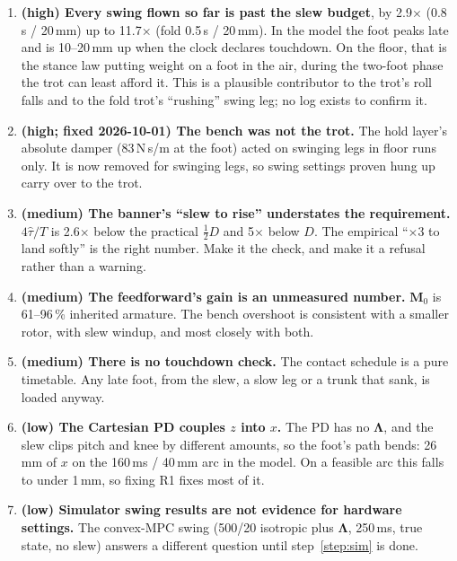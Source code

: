 \documentclass[11pt,a4paper]{article}
\newcommand{\Mmat}{\mathbf{M}}
\begin{document}
\begin{enumerate}[leftmargin=1.6em, label=\textbf{R\arabic*}]
\item \textbf{(high) Every swing flown so far is past the slew budget}, by
2.9$\times$ (0.8\,s / 20\,mm) up to 11.7$\times$ (fold 0.5\,s / 20\,mm). In the
model the foot peaks late and is 10--20\,mm up when the clock declares
touchdown. On the floor, that is the stance law putting weight on a foot in
the air, during the two-foot phase the trot can least afford it. This is a
plausible contributor to the trot's roll falls and to the fold trot's
``rushing'' swing leg; no log exists to confirm it.

\item \textbf{(high; fixed 2026-10-01) The bench was not the trot.} The hold
layer's absolute damper (83\,N\,s/m at the foot) acted on swinging legs in
floor runs only. It is now removed for swinging legs, so swing settings
proven hung up carry over to the trot.

\item \textbf{(medium) The banner's ``slew to rise'' understates the
requirement.} $4\hat\tau/T$ is 2.6$\times$ below the practical $\tfrac12 D$
and 5$\times$ below $D$. The empirical ``$\times 3$ to land softly'' is the
right number. Make it the check, and make it a refusal rather than a warning.

\item \textbf{(medium) The feedforward's gain is an unmeasured number.}
$\Mmat_0$ is 61--96\,\% inherited armature. The bench overshoot is consistent
with a smaller rotor, with slew windup, and most closely with both.

\item \textbf{(medium) There is no touchdown check.} The contact schedule is a
pure timetable. Any late foot, from the slew, a slow leg or a trunk that sank,
is loaded anyway.

\item \textbf{(low) The Cartesian PD couples $z$ into $x$.} The PD has no
$\boldsymbol\Lambda$, and the slew clips pitch and knee by different amounts,
so the foot's path bends: 26\,mm of $x$ on the 160\,ms / 40\,mm arc in the
model. On a feasible arc this falls to under 1\,mm, so fixing R1 fixes most
of it.

\item \textbf{(low) Simulator swing results are not evidence for hardware
settings.} The convex-MPC swing (500/20 isotropic plus $\boldsymbol\Lambda$,
250\,ms, true state, no slew) answers a different question until
step~\ref{step:sim} is done.
\end{enumerate}
\end{document}
